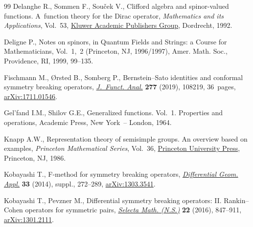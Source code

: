 \documentclass[pdftex]{sigma}
\numberwithin{equation}{section}
\begin{document}
\begin{thebibliography}{99}
Delanghe R., Sommen F., Sou\v{c}ek V., Clifford algebra and spinor-valued
 functions. A~function theory for the Dirac operator, \textit{Mathematics and
 its Applications}, Vol.~53, \href{https://doi.org/10.1007/978-94-011-2922-0}{Kluwer Academic Publishers Group}, Dordrecht,
 1992.

Deligne P., Notes on spinors, in Quantum Fields and Strings: a Course for
 Mathematicians, {V}ol.~1,~2 ({P}rinceton, {NJ}, 1996/1997), Amer. Math. Soc.,
 Providence, RI, 1999, 99--135.

Fischmann M., {\O}rsted B., Somberg P., Bernstein--{S}ato identities and
 conformal symmetry breaking operators, \href{https://doi.org/10.1016/j.jfa.2019.04.002}{\textit{J.~Funct. Anal.}} \textbf{277}
 (2019), 108219, 36~pages, \href{https://arxiv.org/abs/1711.01546}{arXiv:1711.01546}.

Gel'fand I.M., Shilov G.E., Generalized functions. {V}ol.~1. Properties and
 operations, Academic Press, New York~-- London, 1964.

Knapp A.W., Representation theory of semisimple groups. An overview based on
 examples, \textit{Princeton Mathematical Series}, Vol.~36, \href{https://doi.org/10.1515/9781400883974}{Princeton
 University Press}, Princeton, NJ, 1986.

Kobayashi T., F-method for symmetry breaking operators, \href{https://doi.org/10.1016/j.difgeo.2013.10.003}{\textit{Differential
 Geom. Appl.}} \textbf{33} (2014), suppl., 272--289, \href{https://arxiv.org/abs/1303.3541}{arXiv:1303.3541}.

Kobayashi T., Pevzner M., Differential symmetry breaking operators: {II}.
 {R}ankin--{C}ohen operators for symmetric pairs, \href{https://doi.org/10.1007/s00029-015-0208-8}{\textit{Selecta Math.
 (N.S.)}} \textbf{22} (2016), 847--911, \href{https://arxiv.org/abs/1301.2111}{arXiv:1301.2111}.

\end{thebibliography}\LastPageEnding
\end{document}
